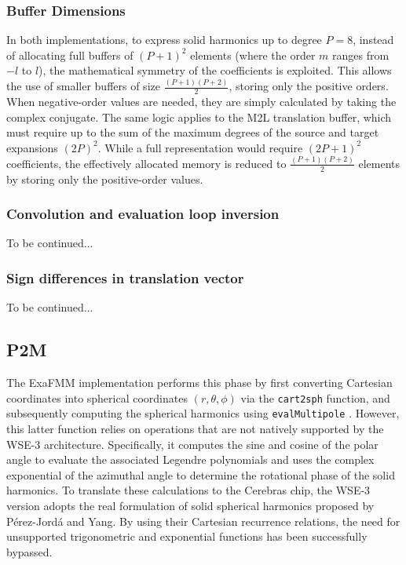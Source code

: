 \documentclass[10pt,dvipsnames,table]{article}
\let\oldtexttt\texttt
\renewcommand{\texttt}[1]{%
  {\small\colorbox{Mist}{\oldtexttt{\textcolor{DarkInk}{#1}}}}%
}
\begin{document}
\subsubsection{Buffer Dimensions}
In both implementations, to express solid harmonics up to degree $P=8$, instead of allocating full buffers of $(P+1)^2$ elements (where the order $m$ ranges from $-l$ to $l$), the mathematical symmetry of the coefficients is exploited. 
This allows the use of smaller buffers of size $\frac{(P+1)(P+2)}{2}$, storing only the positive orders.
When negative-order values are needed, they are simply calculated by taking the complex conjugate.
The same logic applies to the M2L translation buffer, which must require up to the sum of the maximum degrees of the source and target expansions $(2P)^2$. While a full representation would require $(2P+1)^2$ coefficients, the effectively allocated memory is reduced to $\frac{(P+1)(P+2)}{2}$ elements by storing only the positive-order values.

\subsubsection{Convolution and evaluation loop inversion}
To be continued...

\subsubsection{Sign differences in translation vector}
To be continued...

\subsection{P2M}

The ExaFMM implementation performs this phase by first converting Cartesian coordinates into spherical coordinates $(r, \theta, \phi)$ via the \texttt{cart2sph} function, and subsequently computing the spherical harmonics using \texttt{evalMultipole}. 
However, this latter function relies on operations that are not natively supported by the WSE-3 architecture. 
Specifically, it computes the sine and cosine of the polar angle to evaluate the associated Legendre polynomials and uses the complex exponential of the azimuthal angle to determine the rotational phase of the solid harmonics.
To translate these calculations to the Cerebras chip, the WSE-3 version adopts the real formulation of solid spherical harmonics proposed by Pérez-Jordá and Yang. 
By using their Cartesian recurrence relations, the need for unsupported trigonometric and exponential functions has been successfully bypassed.
\end{document}
